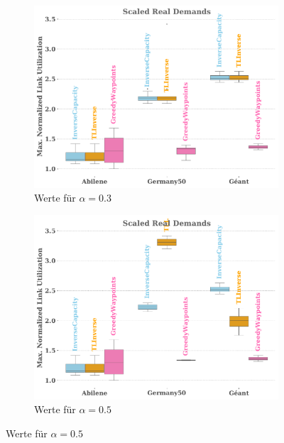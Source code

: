         \begin{figure}
            \centering
            \begin{subfigure}{0.45\textwidth}
                \centering
                \includegraphics[width=1\linewidth]{Report/bilder/reproduktion/projekt1/real_demands alpha_0,3.pdf}
                \caption{Werte für $\alpha = 0.3$}
                \label{fig:reproduktion_project_1_a=0.3}
            \end{subfigure}
            \begin{subfigure}{0.45\textwidth}
                \centering
                \includegraphics[width=1\linewidth]{Report/bilder/reproduktion/projekt1/real_demands alpha_0,5.pdf}
                \caption{Werte für $\alpha = 0.5$}

\end{subfigure}
\end{figure}
